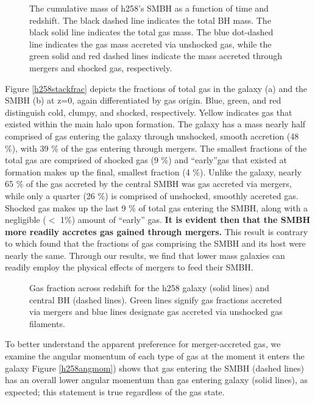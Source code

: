 \documentclass[12pt,headA,chapB]{fiskthesis}
\begin{document}
\begin{figure}
\centerline{}
\caption[GASOLINE h258 SMBH Cumulative Mass]{The cumulative mass of h258's SMBH as a function of time and redshift. The black dashed line indicates the total BH mass. The black solid line indicates the total gas mass. The blue dot-dashed line indicates the gas mass accreted via unshocked gas, while the green solid and red dashed lines indicate the mass accreted through mergers and shocked gas, respectively.}
\label{h258allmassgas} 
\end{figure}

Figure \ref{h258stackfrac} depicts the fractions of total gas in the galaxy (a) and the SMBH (b) at z=0, again differentiated by gas origin. Blue, green, and red distinguish cold, clumpy, and shocked, respectively. Yellow indicates gas that existed within the main halo upon formation. The galaxy has a mass nearly half comprised of gas entering the galaxy through unshocked, smooth accretion (48 \%), with 39 \% of the gas entering through mergers. The smallest fractions of the total gas are comprised of shocked gas (9 \%) and ``early''gas that existed at formation makes up the final, smallest fraction (4 \%). Unlike the galaxy, nearly 65 \% of the gas accreted by the central SMBH was gas accreted via mergers, while only a quarter (26 \%) is comprised of unshocked, smoothly accreted gas. Shocked gas makes up the last 9 \% of total gas entering the SMBH, along with a negligible ($<$ 1\%) amount of ``early'' gas. \textbf{It is evident then that the SMBH more readily accretes gas gained through mergers.} This result is contrary to \cite{Bellovary2013} which found that the fractions of gas comprising the SMBH and its host were nearly the same. Through our results, we find that lower mass galaxies can readily employ the physical effects of mergers to feed their SMBH.

\begin{figure}[h]
\centerline{}
\caption[GASOLINE h258 Galaxy and SMBH Gas Fractions Across Time]{Gas fraction across redshift for the h258 galaxy (solid lines) and central BH (dashed lines). Green lines signify gas fractions accreted via mergers and blue lines designate gas accreted via unshocked gas filaments.}
\label{h258numfrac} 
\end{figure}

To better understand the apparent preference for merger-accreted gas, we examine the angular momentum of each type of gas at the moment it enters the galaxy Figure \ref{h258angmom}) shows that gas entering the SMBH (dashed lines) has an overall lower angular momentum than gas entering galaxy (solid lines), as expected; this statement is true regardless of the gas state. 
\end{document}
